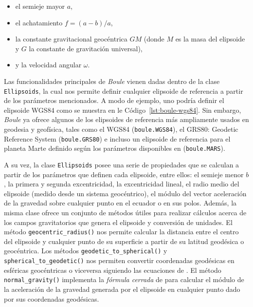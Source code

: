 \begin{itemize}
    \item el semieje mayor $a$,
    \item el achatamiento $f = (a - b) / a$,
    \item la constante gravitacional geocéntrica $GM$ (donde $M$ es la masa
        del elipsoide y $G$ la constante de gravitación universal),
    \item y la velocidad angular $\omega$.
\end{itemize}

Las funcionalidades principales de \emph{Boule} vienen dadas dentro de la clase
\texttt{Ellipsoids}, la cual nos permite definir cualquier elipsoide de
referencia a partir de los parámetros mencionados.
A modo de ejemplo, uno podría definir el elipsoide WGS84 como se muestra en le
Código~\ref{lst:boule-wgs84}.
Sin embargo, \emph{Boule} ya ofrece algunos de los elipsoides de referencia más
ampliamente usados en geodesia y geofísica, tales como el WGS84
(\texttt{boule.WGS84}), el GRS80: Geodetic Reference System
(\texttt{boule.GRS80}) e incluso un elipsoide de referencia para el planeta
Marte definido según los parámetros disponibles en \citet{ardalan2009}
(\texttt{boule.MARS}).



A su vez, la clase \texttt{Ellipsoids} posee una serie de propiedades que se
calculan a partir de los parámetros que definen cada elipsoide, entre ellos: el
semieje menor $b$, la primera y segunda excentricidad, la excentricidad lineal,
el radio medio del elipsoide (medido desde un sistema geocéntrico), el módulo
del vector aceleración de la gravedad sobre cualquier punto en el ecuador o en
sus polos.
Además, la misma clase ofrece un conjunto de métodos útiles para realizar
cálculos acerca de los campos gravitatorios que genera el elipsoide
y conversión de unidades.
El método \texttt{geocentric\_radius()} nos permite calcular la distancia entre
el centro del elipsoide y cualquier punto de su superficie a partir de su
latitud geodésica o geocéntrica.
Los métodos \texttt{geodetic\_to\_spherical()}
y \texttt{spherical\_to\_geodetic()} nos permiten convertir coordenadas
geodésicas en esféricas geocéntricas o viceversa siguiendo las ecuaciones de
\citet{vermeille2002}.
El método \texttt{normal\_gravity()} implementa la \emph{fórmula cerrada} de
\citet{li2001a} para calcular el módulo de la aceleración de la gravedad
generada por el elipsoide en cualquier punto dado por sus coordenadas
geodésicas.

